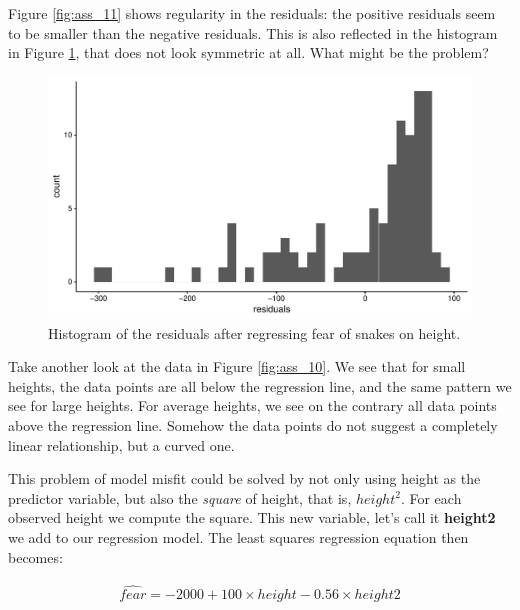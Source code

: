 \documentclass[]{book}\usepackage[]{graphicx}\usepackage[]{color}
\makeatletter
\def\maxwidth{ %
  \ifdim\Gin@nat@width>\linewidth
    \linewidth
  \else
    \Gin@nat@width
  \fi
}
\newenvironment{knitrout}{}{} %
\makeatother
\begin{document}
Figure \ref{fig:ass_11} shows regularity in the residuals: the positive residuals seem to be smaller than the negative residuals. This is also reflected in the histogram in Figure \ref{fig:ass_12}, that does not look symmetric at all. What might be the problem?

\begin{knitrout}
\color{fgcolor}\begin{figure}

{\centering \includegraphics[width=\maxwidth]{figure/ass_12-1} 

}

\caption[Histogram of the residuals after regressing fear of snakes on height]{Histogram of the residuals after regressing fear of snakes on height.}\label{fig:ass_12}
\end{figure}


\end{knitrout}


Take another look at the data in Figure \ref{fig:ass_10}. We see that for small heights, the data points are all below the regression line, and the same pattern we see for large heights. For average heights, we see on the contrary all data points above the regression line. Somehow the data points do not suggest a completely linear relationship, but a curved one. 

This problem of model misfit could be solved by not only using height as the predictor variable, but also the \textit{square} of height, that is, $height^2$. For each observed height we compute the square. This new variable, let's call it \textbf{height2} we add  to our regression model. The least squares regression equation then becomes:

\begin{eqnarray}
\widehat{fear} = -2000 + 100 \times height - 0.56 \times height2 \label{eq:nonlinear}
\end{eqnarray}
\end{document}
